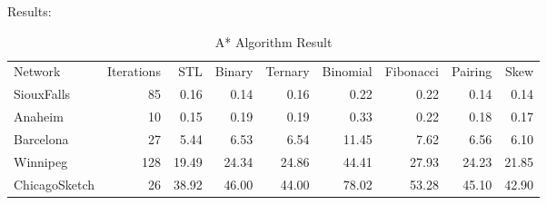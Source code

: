 Results:

\begin{table}[H]
    \centering
    \begin{tabular}{lrr rrr rrr}
        Network        & Iterations & STL & Binary & Ternary & Binomial & Fibonacci & Pairing & Skew \\
        SiouxFalls     & 85           & 0.16 & 0.14 & 0.16 & 0.22  & 0.22  & 0.14  & 0.14            \\
        Anaheim        & 10           & 0.15 & 0.19 & 0.19 & 0.33  & 0.22  & 0.18  & 0.17            \\
        Barcelona      & 27           & 5.44 & 6.53 & 6.54 & 11.45 & 7.62  & 6.56  & 6.10            \\
        Winnipeg       & 128          & 19.49& 24.34& 24.86& 44.41 & 27.93 & 24.23 & 21.85           \\ 
        ChicagoSketch  & 26           & 38.92& 46.00   & 44.00   & 78.02 & 53.28 & 45.10 & 42.90       
    \end{tabular}
    \caption{A* Algorithm Result}
    \label{table:astarresult}
\end{table}


